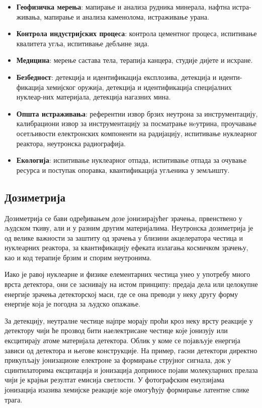 \documentclass[12pt,a4paper,serbian,oneside]{book}
\begin{document}
\begin{itemize}
  
\item \textbf{Геофизичка мерења}: мапирање и анализа рудника минерала, нафтна истра-живања, мапирање и анализа каменолома, истраживање урана.

  \item \textbf{Контрола индустријских процеса}: контрола цементног процеса, испитивање квалитета угља, испитивање дебљине зида.

  \item \textbf{Медицина}: мерење састава тела, терапија канцера, студије дијете и исхране.

  \item \textbf{Безбедност}: детекција и идентификација експлозива, детекција и иденти-фикација хемијског оружија, детекција и идентификација специјалних нуклеар-них материјала, детекција нагазних мина.

  \item \textbf{Општа истраживања}: референтни извор брзих неутрона за инструментацију, калибрациони извор за инструментацију за посматрање нeутрина, проучавање осетљивости електронских компоненти на радијацију, испитивање нуклеарног реактора, неутронска радиографија.

  \item \textbf{Екологија}: испитивање нуклеарног отпада, испитивање отпада за очување ресурса и поступак опоравка, квантификација угљеника у земљишту.

\end{itemize}

\subsection{Дозиметрија}

Дозиметрија се бави одређивањем дозе јонизирајућег зрачења, првенствено у људском ткиву, али и у разним другим материјалима. Неутронска дозиметрија је од велике важности за заштиту од зрачења у близини акцелератора честица и нуклеарних реактора, за квантификацију ефеката излагања космичком зрачењу, као и код терапије брзим и спорим неутронима.

Иако је равој нуклеарне и физике елементарних честица унео у употребу много врста детектора, они се заснивају на истом принципу: предаја дела или целокупне енергије зрачења детекторској маси, где се она преводи у неку другу форму енергије која је погодна за људско опажање.

За детекцију, неутралне честице најпре морају проћи кроз неку врсту реакције у детектору чији ће прозвод бити наелектрисане честице које јонизују или ексцитирају атоме материјала детектора. Облик у коме се појављује енергија зависи од детектора и његове конструкције.  На пример, гасни детектори директно прикупљају јонизационе електроне за формирање струјног сигнала, док у сцинтилаторима  ексцитација и јонизација доприносе појави молекуларних прелаза чији је крајњи резултат емисија светлости. У фотографским емулзијама јонизација изазива хемијске реакције које омогућују формирање латентне слике трага.
\end{document}
